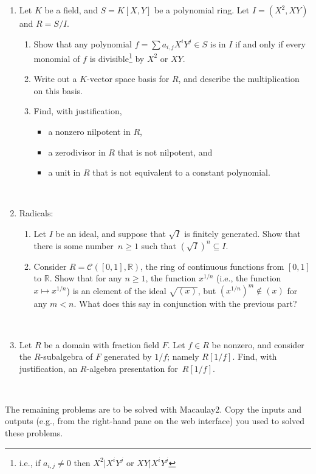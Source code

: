 \documentclass[12pt]{amsart}
\newcommand{\R}{\mathbb{R}}
\begin{document}
	
\begin{enumerate}
\item Let $K$ be a field, and $S=K[X,Y]$ be a polynomial ring. Let $I=(X^2,XY)$ and $R=S/I$.
\begin{enumerate}
\item Show that any polynomial $f=\sum a_{i,j} X^i Y^j \in S$ is in $I$ if and only if every monomial of $f$ is divisible\footnote{i.e., if $a_{i,j}\neq 0$ then $X^2 | X^i Y^j$ or $XY | X^i Y^j$} by $X^2$ or $XY$.
\item Write out a $K$-vector space basis for $R$, and describe the multiplication on this basis.
\item Find, with justification,
\begin{itemize}
\item a nonzero nilpotent in $R$,
\item a zerodivisor in $R$ that is not nilpotent, and
\item a unit in $R$ that is not equivalent to a constant polynomial.
\end{itemize}
\end{enumerate}


\


\item Radicals:
\begin{enumerate}
\item Let $I$ be an ideal, and suppose that $\sqrt{I}$ is finitely generated. Show that there is some number~$n\geq 1$ such that $(\sqrt{I})^n \subseteq I$.
\item Consider $R=\mathcal{C}([0,1],\R)$, the ring of continuous functions from $[0,1]$ to $\R$. Show that for any $n\geq 1$, the function $x^{1/n}$ (i.e., the function $x\mapsto x^{1/n}$) is an element of the ideal $\sqrt{(x)}$, but $(x^{1/n})^m \notin (x)$ for any $m<n$. What does this say in conjunction with the previous part?
\end{enumerate}

\


\item Let $R$ be a domain with fraction field $F$. Let $f\in R$ be nonzero, and consider the $R$-subalgebra of $F$ generated by $1/f$; namely $R[1/f]$. Find, with justification, an $R$-algebra presentation for~$R[1/f]$.


\end{enumerate}

\


The remaining problems are to be solved with Macaulay2. Copy the inputs and outputs (e.g., from the right-hand pane on the web interface) you used to solved these problems.
\end{document}
